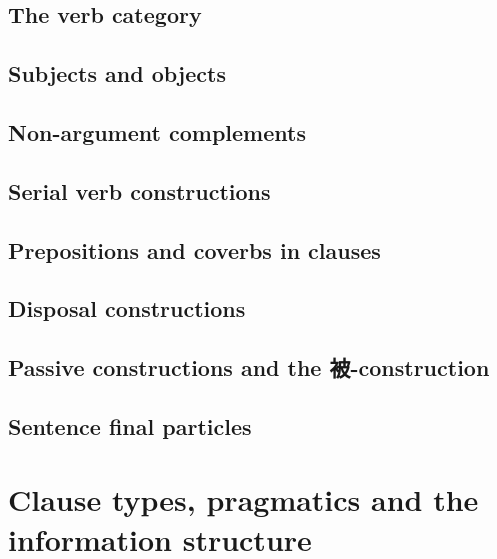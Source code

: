 \documentclass[UTF8, a4paper, oneside, scheme=plain]{ctexbook}
\numberwithin{equation}{chapter}
\numberwithin{equation}{chapter}
\begin{document}


\chapter{The verb category}



\chapter{Subjects and objects}%

\chapter{Non-argument complements}



\chapter{Serial verb constructions} %

\chapter{Prepositions and coverbs in clauses}\label{chap:coverbs}



\chapter{Disposal constructions}\label{chap:disposal}

\chapter{Passive constructions and the 被-construction}\label{chap:passive}

\chapter{Sentence final particles}




\part{Clause types, pragmatics and the information structure}%
\end{document}
